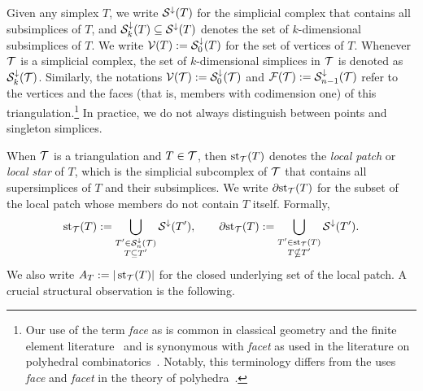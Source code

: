\documentclass[10pt,a4paper]{article}
\newcommand{\mwl}[1]{{\color{red}#1}}
\begin{document}
Given any simplex $T$, we write ${\mathcal S}^{\downarrow}(T)$ for the simplicial complex that contains all subsimplices of $T$,
and ${\mathcal S}^{\downarrow}_{{k}}(T) \subseteq {\mathcal S}^{\downarrow}(T)$ denotes the set of $k$-dimensional subsimplices of $T$. 
We write ${\mathcal V}(T) := {\mathcal S}^{\downarrow}_{0}(T)$ for the set of vertices of $T$.
% 
Whenever ${\mathcal T}$ is a simplicial complex, 
the set of $k$-dimensional simplices in ${\mathcal T}$ is denoted as ${\mathcal S}^{\downarrow}_{{k}}({\mathcal T})$. 
Similarly, the notations ${\mathcal V}({\mathcal T}) := {\mathcal S}^{\downarrow}_{0}({\mathcal T})$ and ${\mathcal F}({\mathcal T}) := {\mathcal S}^{\downarrow}_{n-1}({\mathcal T})$ refer to the vertices and the faces (that is, members with codimension one) of this triangulation.\footnote{
    Our use of the term \emph{face} as is common in classical geometry and the finite element literature~\cite{brenner2008mathematical}
    and is synonymous with \emph{facet} as used in the literature on polyhedral combinatorics~\cite{schrijver1998theory}.
    Notably, this terminology differs from the uses \emph{face} and \emph{facet} in the theory of polyhedra~\cite{ziegler1995lectures}.
}
In practice, we do not always distinguish between points and singleton simplices. 

When ${\mathcal T}$ is a triangulation and $T \in {\mathcal T}$, then $\operatorname{st}_{{\mathcal T}}(T)$ denotes the \emph{local patch} or \emph{local star} of $T$, 
which is the simplicial subcomplex of ${\mathcal T}$ that contains all supersimplices of $T$ and their subsimplices. 
We write ${\partial \rm st}_{{\mathcal T}}(T)$ for the subset of the local patch whose members do not contain $T$ itself. 
Formally,
\begin{gather*}
    \operatorname{st}_{{\mathcal T}}(T) := \bigcup_{ \substack{ T' \in {\mathcal S}^{\downarrow}_{n}({\mathcal T}) \\ T \subseteq T' } } {\mathcal S}^{\downarrow}(T'),
    \qquad 
    {\partial \rm st}_{{\mathcal T}}(T) := \bigcup_{ \substack{ T' \in \operatorname{st}_{{\mathcal T}}(T) \\ T \nsubseteq T' } } {\mathcal S}^{\downarrow}(T').
\end{gather*}
We also write $A_T := | \operatorname{st}_{{\mathcal T}}(T) |$ for the closed underlying set of the local patch. 
A crucial structural observation is the following.
\end{document}

